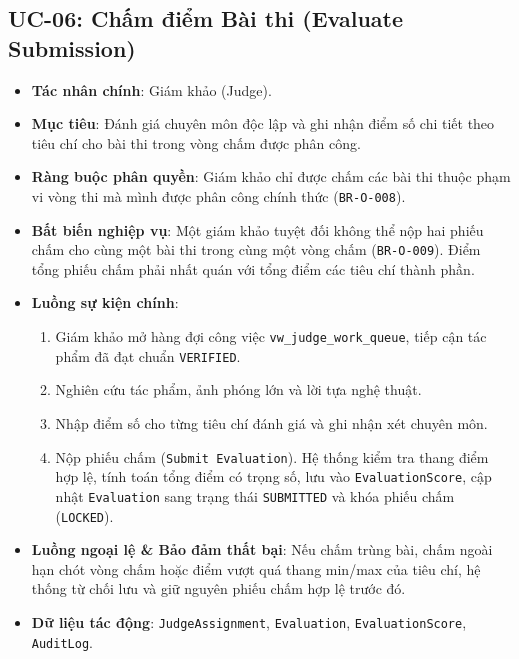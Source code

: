 \subsection{UC-06: Chấm điểm Bài thi (Evaluate Submission)}
\begin{itemize}
    \item \textbf{Tác nhân chính}: Giám khảo (Judge).
    \item \textbf{Mục tiêu}: Đánh giá chuyên môn độc lập và ghi nhận điểm số chi tiết theo tiêu chí cho bài thi trong vòng chấm được phân công.
    \item \textbf{Ràng buộc phân quyền}: Giám khảo chỉ được chấm các bài thi thuộc phạm vi vòng thi mà mình được phân công chính thức (\texttt{BR-O-008}).
    \item \textbf{Bất biến nghiệp vụ}: Một giám khảo tuyệt đối không thể nộp hai phiếu chấm cho cùng một bài thi trong cùng một vòng chấm (\texttt{BR-O-009}). Điểm tổng phiếu chấm phải nhất quán với tổng điểm các tiêu chí thành phần.
    \item \textbf{Luồng sự kiện chính}:
    \begin{enumerate}
        \item Giám khảo mở hàng đợi công việc \texttt{vw\_judge\_work\_queue}, tiếp cận tác phẩm đã đạt chuẩn \texttt{VERIFIED}.
        \item Nghiên cứu tác phẩm, ảnh phóng lớn và lời tựa nghệ thuật.
        \item Nhập điểm số cho từng tiêu chí đánh giá và ghi nhận xét chuyên môn.
        \item Nộp phiếu chấm (\texttt{Submit Evaluation}). Hệ thống kiểm tra thang điểm hợp lệ, tính toán tổng điểm có trọng số, lưu vào \texttt{EvaluationScore}, cập nhật \texttt{Evaluation} sang trạng thái \texttt{SUBMITTED} và khóa phiếu chấm (\texttt{LOCKED}).
    \end{enumerate}
    \item \textbf{Luồng ngoại lệ \& Bảo đảm thất bại}: Nếu chấm trùng bài, chấm ngoài hạn chót vòng chấm hoặc điểm vượt quá thang min/max của tiêu chí, hệ thống từ chối lưu và giữ nguyên phiếu chấm hợp lệ trước đó.
    \item \textbf{Dữ liệu tác động}: \texttt{JudgeAssignment}, \texttt{Evaluation}, \texttt{EvaluationScore}, \texttt{AuditLog}.
\end{itemize}

